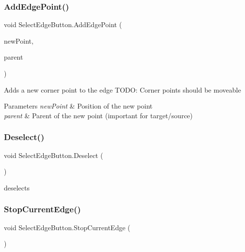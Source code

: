 \subsubsection{\texorpdfstring{Add\+Edge\+Point()}{AddEdgePoint()}}
{\footnotesize\ttfamily void Select\+Edge\+Button.\+Add\+Edge\+Point (\begin{DoxyParamCaption}\item[{Vector2}]{new\+Point,  }\item[{Game\+Object}]{parent }\end{DoxyParamCaption})}



Adds a new corner point to the edge T\+O\+DO\+: Corner points should be moveable 


\begin{DoxyParams}{Parameters}
{\em new\+Point} & Position of the new point\\
\hline
{\em parent} & Parent of the new point (important for target/source)\\
\hline
\end{DoxyParams}
\mbox{\label{class_select_edge_button_a2955591ac3928b72e096de918c98f9e4}} 
\subsubsection{\texorpdfstring{Deselect()}{Deselect()}}
{\footnotesize\ttfamily void Select\+Edge\+Button.\+Deselect (\begin{DoxyParamCaption}{ }\end{DoxyParamCaption})}



deselects 

\mbox{\label{class_select_edge_button_a95682addf9c0dc548bdbec0677295275}} 
\subsubsection{\texorpdfstring{Stop\+Current\+Edge()}{StopCurrentEdge()}}
{\footnotesize\ttfamily void Select\+Edge\+Button.\+Stop\+Current\+Edge (\begin{DoxyParamCaption}{ }\end{DoxyParamCaption})}



